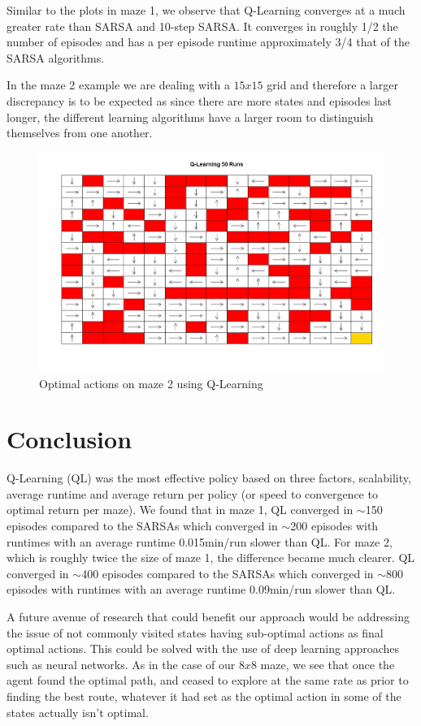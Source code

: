 \documentclass[final,12pt,3p]{elsarticle}
\begin{document}
Similar to the plots in maze 1, we observe that Q-Learning converges at a much greater rate than SARSA and 10-step SARSA. It converges in roughly 1/2 the number of episodes and has a per episode runtime approximately 3/4 that of the SARSA algorithms.
\par
In the maze 2 example we are dealing with a $15x15$ grid and therefore a larger discrepancy is to be expected as since there are more states and episodes last longer, the different learning algorithms have a larger room to distinguish themselves from one another.

\begin{figure}[H]
    \centering
    \caption{Optimal actions on maze 2 using Q-Learning}
    \includegraphics[width=13cm]{figures/Maps/Maze2/QLearningMapMaze2.jpeg}
\end{figure}

\section{Conclusion}

\par
Q-Learning (QL) was the most effective policy based on three factors, scalability, average runtime and average return per policy (or speed to convergence to optimal return per maze). We found that in maze 1, QL converged in $\sim$150 episodes compared to the SARSAs which converged in $\sim$200 episodes with runtimes with an average runtime 0.015min/run slower than QL. For maze 2, which is roughly twice the size of maze 1, the difference became much clearer. QL converged in $\sim$400 episodes compared to the SARSAs which converged in $\sim$800 episodes with runtimes with an average runtime 0.09min/run slower than QL.
\par
A future avenue of research that could benefit our approach would be addressing the issue of not commonly visited states having sub-optimal actions as final optimal actions. This could be solved with the use of deep learning approaches such as neural networks. As in the case of our $8x8$ maze, we see that once the agent found the optimal path, and ceased to explore at the same rate as prior to finding the best route, whatever it had set as the optimal action in some of the states actually isn't optimal. 
\end{document}
